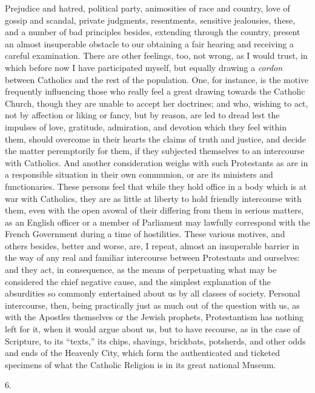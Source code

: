 Prejudice and hatred, political party, animosities of
race and country, love of gossip and scandal, private
judgments, resentments, sensitive jealousies, these, and
a number of bad principles besides, extending through the
country, present an almost insuperable obstacle to our
obtaining a fair hearing and receiving a careful
examination. There are other feelings, too, not wrong, as
I would trust, in which before now I have participated
myself, but equally drawing a \emph{cordon} between
Catholics and the rest of the population. One, for
instance, is the motive frequently influencing those who
really feel a great drawing towards the Catholic Church,
though they are unable to accept her doctrines; and who,
wishing to act, not by affection or liking or fancy, but
by reason, are led to dread lest the impulses of love,
gratitude, admiration, and devotion which they feel
within them, should overcome in their hearts the claims
of truth and justice, and decide the matter peremptorily
for them, if they subjected themselves to an intercourse with Catholics. And another consideration weighs with
such Protestants as are in a responsible situation in
their own communion, or are its ministers and
functionaries. These persons feel that while they hold
office in a body which is at war with Catholics, they are
as little at liberty to hold friendly intercourse with
them, even with the open avowal of their differing from
them in serious matters, as an English officer or a
member of Parliament may lawfully correspond with the
French Government during a time of hostilities. These
various motives, and others besides, better and worse,
are, I repeat, almost an insuperable barrier in the way
of any real and familiar intercourse between Protestants
and ourselves: and they act, in consequence, as the means
of perpetuating what may be considered the chief negative
cause, and the simplest explanation of the absurdities so
commonly entertained about us by all classes of society.
Personal intercourse, then, being practically just as
much out of the question with us, as with the Apostles
themselves or the Jewish prophets, Protestantism has
nothing left for it, when it would argue about us, but to
have recourse, as in the case of Scripture, to its
``texts,'' its chips, shavings, brickbats,
potsherds, and other odds and ends of the Heavenly City,
which form the authenticated and ticketed specimens of
what the Catholic Religion is in its great national
Museum.

6.

